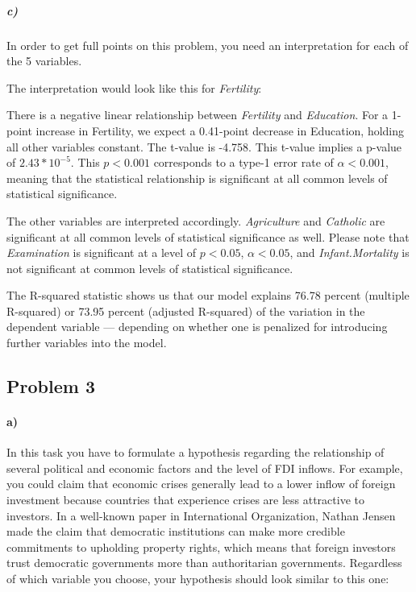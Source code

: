 \documentclass[12pt,letter]{article}\usepackage[]{graphicx}\usepackage[]{color}
\begin{document}
\subparagraph{c)} In order to get full points on this problem, you need an interpretation for each of the 5 variables.

The interpretation would look like this for \textit{Fertility}:

There is a negative linear relationship between \textit{Fertility} and \textit{Education}. For a 1-point increase in Fertility, we expect a 0.41-point decrease in Education, holding all other variables constant. The t-value is -4.758. This t-value implies a p-value of $2.43*10^{-5}$. This $p < 0.001$ corresponds to a type-1 error rate of $\alpha < 0.001$, meaning that the statistical relationship is significant at all common levels of statistical significance.

The other variables are interpreted accordingly. \textit{Agriculture} and \textit{Catholic} are significant at all common levels of statistical significance as well. Please note that \textit{Examination} is significant at a level of $p < 0.05$, $\alpha < 0.05$, and \textit{Infant.Mortality} is not significant at common levels of statistical significance.

The R-squared statistic shows us that our model explains 76.78 percent (multiple R-squared) or 73.95 percent (adjusted R-squared) of the variation in the dependent variable --- depending on whether one is penalized for introducing further variables into the model.



\subsection*{Problem 3}

\paragraph{a)} In this task you have to formulate a hypothesis regarding the relationship of several political and economic factors and the level of FDI inflows. For example, you could claim that economic crises generally lead to a lower inflow of foreign investment because countries that experience crises are less attractive to investors. In a well-known paper in International Organization, Nathan Jensen made the claim that democratic institutions can make more credible commitments to upholding property rights, which means that foreign investors trust democratic governments more than authoritarian governments. Regardless of which variable you choose, your hypothesis should look similar to this one:
\end{document}
